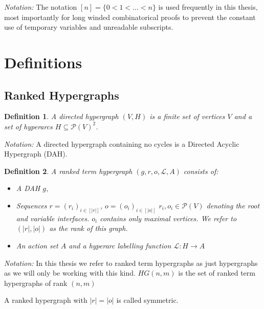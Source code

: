 \documentclass[12pt]{article}
\newtheorem{definition}{Definition}[section]
\renewcommand{\P}{\mathcal{P}}
\newcommand{\1}{\mathbbm{1}}
\renewcommand{\L}{\mathcal{L}}
\begin{document}
\emph{Notation:} The notation $[n] = \{0 < 1 < \dots < n\}$ is used frequently in this thesis, most importantly for long winded combinatorical proofs to prevent the constant use of temporary variables and unreadable subscripts. 

\newpage
\section{Definitions}
\subsection{Ranked Hypergraphs}
\begin{definition}
    A directed \emph{hypergraph} $(V,H)$ is a finite set of vertices $V$ and a set of \emph{hyperarcs} $H\subseteq \P(V)^2$.
\end{definition}

\emph{Notation:} A directed hypergraph containing no cycles is a Directed Acyclic Hypergraph (DAH).\\

\begin{definition}
A \emph{ranked term hypergraph} $(g, r, o, \L, A)$ consists of:
\begin{itemize}
\item A DAH $g$,
\item Sequences $r = (r_i)_{i\in[|r|]}$, $o = (o_i)_{i\in[|o|]}$ $r_i, o_i\in \P(V)$ denoting the root and variable interfaces. $o_i$ contains only maximal vertices. We refer to $(|r|, |o|)$ as the \emph{rank} of this graph.
\item An action set $A$ and a hyperarc labelling function $\L: H\to A$
\end{itemize}
\end{definition}
\emph{Notation:} In this thesis we refer to ranked term hypergraphs as just hypergraphs as we will only be working with this kind. $HG(n,m)$ is the set of ranked term  hypergraphs of rank $(n,m)$

A ranked hypergraph with $|r| = |o|$ is called symmetric.\\
\end{document}
